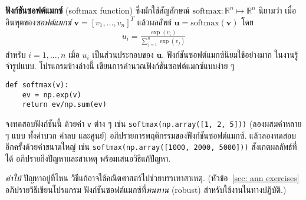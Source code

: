 \begin{Exercise}
	\label{ex: num nan}
	
	\textbf{ฟังก์ชันซอฟต์แมกซ์} (softmax function)
	ซึ่งมักใช้สัญลักษณ์ $\mathrm{softmax}: \mathbb{R}^n \mapsto \mathbb{R}^n$ นิยามว่า
	เมื่อ อินพุตของ\textit{ซอฟต์แมกซ์} $\bm{v} = [v_1, \ldots, v_n]^T$
	แล้วผลลัพธ์ $\bm{u} = \mathrm{softmax}(\bm{v})$ โดย
	\begin{eqnarray}
	u_i
	= \frac{\exp(v_i)}{\sum_{j=1}^n \exp(v_j)}
	\nonumber 
	\end{eqnarray}
	สำหรับ $i = 1, \ldots, n$ เมื่อ $u_i$ เป็นส่วนประกอบของ $\bm{u}$.
ฟังก์ชันซอฟต์แมกซ์นิยมใช้อย่างมาก ในงานรู้จำรูปแบบ.
โปรแกรมข้างล่างนี้ เขียนการคำนวณฟังก์ชันซอฟต์แมกซ์แบบง่าย ๆ
\begin{Verbatim}[fontsize=\small]
def softmax(v):
    ev = np.exp(v)
    return ev/np.sum(ev)
\end{Verbatim}

จงทดสอบฟังก์ชันนี้ ด้วยค่า \verb|v| ต่าง ๆ
เช่น \verb|softmax(np.array([1, 2, 5]))|
%
(ลองผสมค่าหลาย ๆ แบบ ทั้งค่าบวก ค่าลบ และศูนย์)
อภิปรายการพฤติกรรมของฟังก์ชันซอฟต์แมกซ์.
%
แล้วลองทดสอบอีกครั้งด้วยค่าขนาดใหญ่ เช่น
\verb|softmax(np.array([1000, 2000, 5000]))|
สังเกตผลลัพธ์ที่ได้
อภิปรายถึงปัญหาและสาเหตุ พร้อมเสนอวิธีแก้ปัญหา.

\textit{คำใบ้}
ปัญหาอยู่ที่ไหน 
วิธีแก้อาจใช้คณิตศาสตร์ไปช่วยบรรเทาสาเหตุ.
(หัวข้อ~\ref{sec: ann exercises}
อภิปรายวิธีเขียนโปรแกรม
ฟังก์ชันซอฟต์แมกซ์ที่\textit{ทนทาน} (robust)
สำหรับใช้งานในทางปฏิบัติ.)

\end{Exercise}

	
	
	

